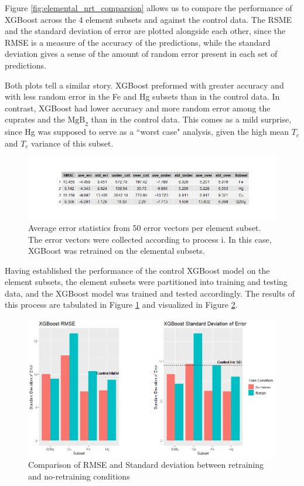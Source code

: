 \documentclass[oneside,12pt]{amsart}
\begin{document}
 Figure \ref{fig:elemental_nrt_comparsion} allows us to compare the performance of XGBoost across the 4 element subsets and against the control data. The RSME and the standard deviation of error are plotted alongside each other, since the RMSE is a measure of the accuracy of the predictions, while the standard deviation gives a sense of the amount of random error present in each set of predictions.
 
 Both plots tell a similar story. XGBoost preformed with greater accuracy and with less random error in the Fe and Hg subsets than in the control data. In contrast, XGBoost had lower accuracy and more random error among the cuprates and the $\text{MgB}_2$ than in the control data. This comes as a mild surprise, since Hg was supposed to serve as a ``worst case" analysis, given the high mean $T_c$ and $T_c$ variance of this subset.
 
 \begin{figure}
     \centering
     \includegraphics[width = \linewidth]{Elelmental_rt_ave_tbl.png}
     \caption{Average error statistics from 50 error vectors per element subset. The error vectors were collected according to process i. In this case, XGBoost was retrained on the elemental subsets.}
     \label{fig:elemental_rt_tbl}
 \end{figure}
 
 Having established the performance of the control XGBoost model on the element subsets, the element subsets were partitioned into training and testing data, and the XGBoost model was trained and tested accordingly. The results of this process are tabulated in Figure \ref{fig:elemental_rt_tbl} and visualized in Figure \ref{fig:elemental_rt_brplt}.
  \begin{figure}[h]
     \centering
     \includegraphics[width=\linewidth]{Elemental_comparison_bxplt.png}
     \caption{Comparison of RMSE and Standard deviation between retraining and no-retraining conditions}
     \label{fig:elemental_rt_brplt}
 \end{figure}
 
\end{document}
